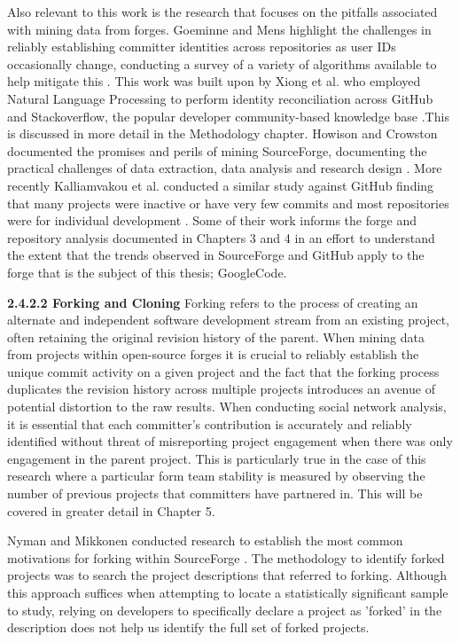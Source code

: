 Also relevant to this work is the research that focuses on the pitfalls associated with mining data from forges. Goeminne and Mens highlight the challenges in reliably establishing committer identities across repositories as user IDs occasionally change, conducting a survey of a variety of algorithms available to help mitigate this \citep{goeminne2013comparison}. This work was built upon by Xiong et al. who employed Natural Language Processing to perform identity reconciliation across GitHub and Stackoverflow, the popular developer community-based knowledge base \citep{xiong2017mining, github, stackoverflow}.This is discussed in more detail in the Methodology chapter. Howison and Crowston documented the promises and perils of mining SourceForge, documenting the practical challenges of data extraction, data analysis and research design \citep{howison2004perils}. More recently Kalliamvakou et al. conducted a similar study against GitHub finding that many projects were inactive or have very few commits and most repositories were for individual development \citep{kalliamvakou2014promises}. Some of their work informs the forge and repository analysis documented in Chapters 3 and 4 in an effort to understand the extent that the trends observed in SourceForge and GitHub apply to the forge that is the subject of this thesis; GoogleCode.

\newline
\textbf{2.4.2.2 Forking and Cloning}
\newline
Forking refers to the process of creating an alternate and independent software development stream from an existing project, often retaining the original revision history of the parent. When mining data from projects within open-source forges it is crucial to reliably establish the unique commit activity on a given project and the fact that the forking process duplicates the revision history across multiple projects introduces an avenue of potential distortion to the raw results. When conducting social network analysis, it is essential that each committer's contribution is accurately and reliably identified without threat of misreporting project engagement when there was only engagement in the parent project. This is particularly true in the case of this research where a particular form team stability is measured by observing the number of previous projects that committers have partnered in. This will be covered in greater detail in Chapter 5.

Nyman and Mikkonen conducted research to establish the most common motivations for forking within SourceForge \citep{nyman2011fork}. The methodology to identify forked projects was to search the project descriptions that referred to forking. Although this approach suffices when attempting to locate a statistically significant  sample to study, relying on developers to specifically declare a project as 'forked' in the description does not help us identify the full set of forked projects.

